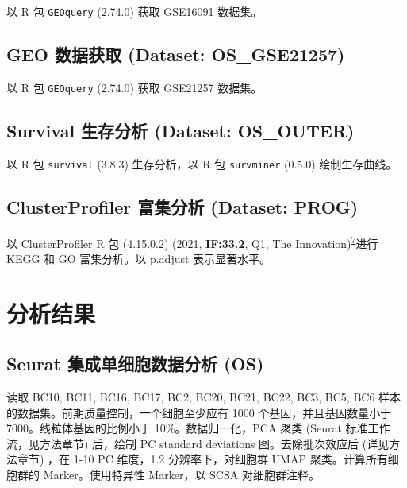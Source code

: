 \documentclass[
]{article}
\begin{document}
以 R 包 \texttt{GEOquery} (2.74.0) 获取 GSE16091 数据集。

\hypertarget{geo-ux6570ux636eux83b7ux53d6-dataset-os_gse21257}{%
\subsection{GEO 数据获取 (Dataset: OS\_GSE21257)}\label{geo-ux6570ux636eux83b7ux53d6-dataset-os_gse21257}}

以 R 包 \texttt{GEOquery} (2.74.0) 获取 GSE21257 数据集。

\hypertarget{survival-ux751fux5b58ux5206ux6790-dataset-os_outer}{%
\subsection{Survival 生存分析 (Dataset: OS\_OUTER)}\label{survival-ux751fux5b58ux5206ux6790-dataset-os_outer}}

以 R 包 \texttt{survival} (3.8.3) 生存分析，以 R 包 \texttt{survminer} (0.5.0) 绘制生存曲线。

\hypertarget{clusterprofiler-ux5bccux96c6ux5206ux6790-dataset-prog}{%
\subsection{ClusterProfiler 富集分析 (Dataset: PROG)}\label{clusterprofiler-ux5bccux96c6ux5206ux6790-dataset-prog}}

以 ClusterProfiler R 包 (4.15.0.2) (2021, \textbf{IF:33.2}, Q1, The Innovation)\textsuperscript{\protect\hyperlink{ref-ClusterprofilerWuTi2021}{7}}进行 KEGG 和 GO 富集分析。以 p.adjust 表示显著水平。

\hypertarget{workflow}{%
\section{分析结果}\label{workflow}}

\hypertarget{seurat-ux96c6ux6210ux5355ux7ec6ux80deux6570ux636eux5206ux6790-os}{%
\subsection{Seurat 集成单细胞数据分析 (OS)}\label{seurat-ux96c6ux6210ux5355ux7ec6ux80deux6570ux636eux5206ux6790-os}}

读取 BC10, BC11, BC16, BC17, BC2, BC20, BC21, BC22, BC3, BC5, BC6 样本的数据集。前期质量控制，一个细胞至少应有 1000 个基因，并且基因数量小于 7000。线粒体基因的比例小于 10\%。数据归一化，PCA 聚类 (Seurat 标准工作流，见方法章节) 后，绘制 PC standard deviations 图。去除批次效应后 (详见方法章节) ，在 1-10 PC 维度，1.2 分辨率下，对细胞群 UMAP 聚类。计算所有细胞群的 Marker。使用特异性 Marker，以 SCSA 对细胞群注释。
\end{document}
